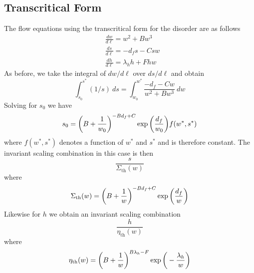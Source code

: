 \documentclass[reprint,amsmath,amssymb,aps,floatfix]{revtex4-1}
\begin{document}
\subsection{\label{app:truncated} Transcritical Form}
The flow equations using the transcritical form for the disorder are as follows
%
\begin{equation}
	\begin{split}
		&\frac{dw}{d\ell}= w^2+B w^3\\
		&\frac{ds}{d\ell}= -d_f s-C s w\\
		&\frac{dh}{d\ell}= \lambda_h h+F h w
		\end{split}
\end{equation}
%
As before, we take the integral of $dw/d\ell$ over $ds/d\ell$ and obtain
%
\begin{equation}
	\int_{s_0}^{s^*}(1/s)\ ds = \int_{w_0}^{w^*}\frac{-d_f-Cw}{w^2+ B w^3}\ dw
\end{equation}
%
\noindent Solving for $s_0$ we have
%
\begin{equation}
	s_0 = \bigg{(}B+\frac{1}{w_0}\bigg{)}^{-B d_f+C}\exp \bigg{(}\frac{d_f}{w_0}\bigg{)}f(w^*, s^*)
\end{equation} 
%
\noindent where $f(w^*, s^*)$ denotes a function of $w^*$ and $s^*$ and is therefore constant. The invariant scaling combination in this case is then
%
\begin{equation}
	\frac{s}{\Sigma_{\textrm{th}}(w)}
\end{equation}
%
\noindent where
%
\begin{equation}
	\Sigma_{\textrm{th}}(w) = \bigg{(}B+\frac{1}{w}\bigg{)}^{-B d_f+C}\exp \bigg{(}\frac{d_f}{w}\bigg{)}
\end{equation}
%
\noindent Likewise for $h$ we obtain an invariant scaling combination
%
\begin{equation}
	\frac{h}{\eta_{\textrm{th}}(w)}
\end{equation}
%
\noindent where
%
\begin{equation}
	\eta_{\textrm{th}}(w) = \bigg{(}B+\frac{1}{w}\bigg{)}^{B \lambda_h-F}\exp \bigg{(}-\frac{\lambda_h}{w}\bigg{)}
\end{equation}
%
\end{document}
